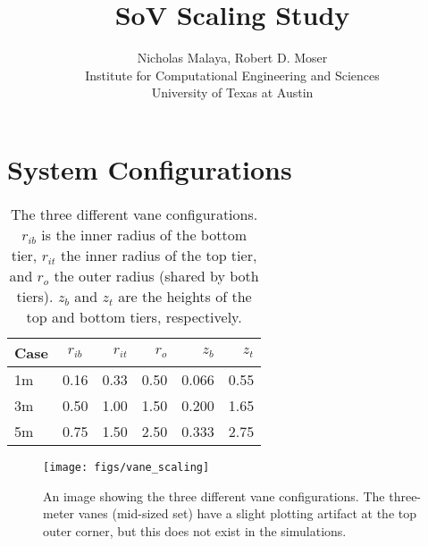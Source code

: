 \documentclass[english]{article}
\title{\bf{SoV Scaling Study}}
\author{Nicholas Malaya, Robert D. Moser \\ Institute for Computational
Engineering and Sciences \\ University of Texas at Austin} \date{}
\begin{document}
\maketitle

\section*{System Configurations}

\begin{table}
\begin{centering}
  \begin{tabular}{ | l || c | r | r | r | r |}
    \hline     
    Case & $r_{ib}$ & $r_{it}$ & $r_{o}$ & $z_{b}$ & $z_{t}$ \\ \hline \hline
    1m   & 0.16     & 0.33     & 0.50    & 0.066   & 0.55 \\ \hline
    3m   & 0.50     & 1.00     & 1.50    & 0.200   & 1.65 \\ \hline
    5m   & 0.75     & 1.50     & 2.50    & 0.333   & 2.75 \\
    \hline 
  \end{tabular}
  \caption{The three different vane configurations. $r_{ib}$ is the inner radius of the bottom tier, 
    $r_{it}$ the inner radius of the top tier, and $r_{o}$ the outer radius (shared by both tiers). 
    $z_{b}$ and $z_{t}$ are the heights of the top and bottom tiers, respectively. }\label{fig:scaling_table}
\end{centering}
\end{table}
%

\begin{figure}[!htb]
  \begin{center}
    \texttt{[image: figs/vane\_scaling]}
    \caption{An image showing the three different vane configurations. The three-meter vanes (mid-sized set) 
      have a slight plotting artifact at the top outer corner, but this does not exist in the simulations. }
    \label{vane_scaling}
  \end{center}
\end{figure}
\end{document}
